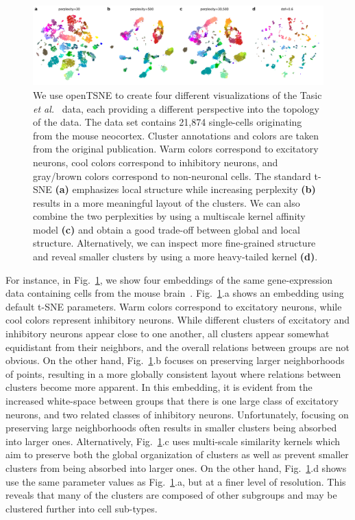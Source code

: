 \documentclass[twocolumn]{bmcart}
\begin{document}
\begin{figure}[htbp]
	\includegraphics[width=\textwidth]{tasic2018}
	\caption{\label{fig:tasic}We use openTSNE to create four different
    visualizations of the Tasic \textit{et al.}~\cite{tasic2018shared} data,
    each providing a different perspective into the topology of the data.
    The data set contains 21,874 single-cells originating from the mouse
	neocortex. Cluster annotations and colors are taken from the original
	publication. Warm colors correspond to excitatory neurons, cool colors
	correspond to inhibitory neurons, and gray/brown colors correspond to
	non-neuronal cells. The standard t-SNE \textbf{(a)} emphasizes local
	structure while increasing perplexity \textbf{(b)} results in a more
	meaningful layout of the clusters. We can also combine the two
	perplexities by using a multiscale kernel affinity model \textbf{(c)}
	and obtain a good trade-off between global and local structure.
	Alternatively, we can inspect more fine-grained structure and reveal
	smaller clusters by using a more heavy-tailed kernel \textbf{(d)}.}
\end{figure}
For instance, in Fig.~\ref{fig:tasic}, we show four embeddings of
the same gene-expression data containing cells from the mouse brain~\cite{tasic2018shared}.
Fig.~\ref{fig:tasic}.a shows an embedding using default t-SNE parameters.
Warm colors correspond to excitatory neurons, while
cool colors represent inhibitory neurons. While different clusters of
excitatory and inhibitory neurons appear close to one another, all clusters
appear somewhat equidistant from their neighbors, and the overall
relations between groups are not obvious. On the other hand,
Fig.~\ref{fig:tasic}.b focuses on preserving larger neighborhoods of points,
resulting in a more globally consistent layout where relations between clusters
become more apparent. In this embedding, it is evident from the increased
white-space between groups that there is one large class of excitatory neurons,
and two related classes of inhibitory neurons. Unfortunately, focusing on
preserving large neighborhoods often results in smaller clusters being absorbed
into larger ones. Alternatively, Fig.~\ref{fig:tasic}.c uses multi-scale
similarity kernels which aim to preserve both the global organization of
clusters as well as prevent smaller clusters from being absorbed into larger
ones. On the other hand, Fig.~\ref{fig:tasic}.d shows use the same parameter
values as Fig.~\ref{fig:tasic}.a, but at a finer level of resolution. This
reveals that many of the clusters are composed of other subgroups and may be
clustered further into cell sub-types.
\end{document}
